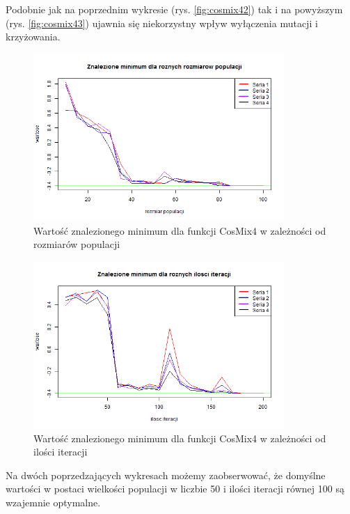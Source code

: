 \documentclass[11pt, a4paper]{article}
\newcommand{\fbi}{\leavevmode{\parindent=1em\indent}}
\begin{document}
\fbi
Podobnie jak na poprzednim wykresie (rys. \ref{fig:cosmix42}) tak i na powyższym (rys. \ref{fig:cosmix43}) ujawnia się niekorzystny wpływ wyłączenia mutacji i krzyżowania.


\begin{figure}[H]
	\begin{center}
		\includegraphics[width=0.85\textwidth]{./assets/CosMix44.png}
		\caption{Wartość znalezionego minimum dla funkcji CosMix4 w zależności od rozmiarów populacji}
		\label{fig:cosmix44}
	\end{center}
\end{figure}

\begin{figure}[H]
	\begin{center}
		\includegraphics[width=0.85\textwidth]{./assets/CosMix45.png}
		\caption{Wartość znalezionego minimum dla funkcji CosMix4 w zależności od ilości iteracji}
		\label{fig:cosmix45}
	\end{center}
\end{figure}

\fbi
Na dwóch poprzedzających wykresach możemy zaobserwować, że domyślne wartości w postaci wielkości populacji w liczbie 50 i ilości iteracji równej 100 są wzajemnie optymalne.
\end{document}
